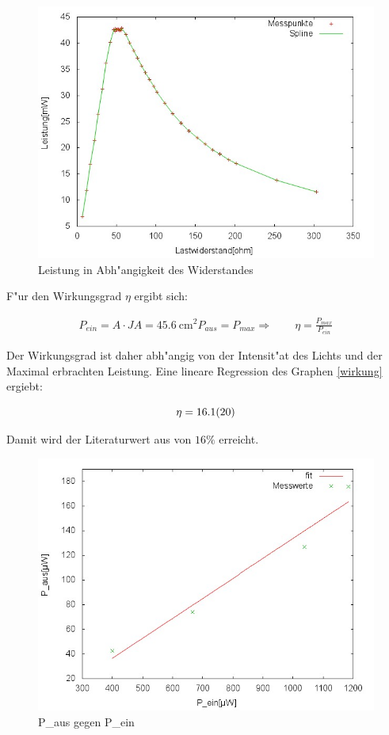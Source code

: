 \begin{figure}[htbp]
		\centering
		\includegraphics[width = 12cm]{img/718p.jpg}
		\caption{Leistung in Abh"angigkeit des Widerstandes}
		\label{PR4}
	\end{figure}

	F"ur den Wirkungsgrad $\eta$ ergibt sich:

	\begin{eqnarray*}
		P_{ein} = A \cdot J
		A = \SI{45.6}{\centi\meter^2}
		P_{aus} = P_{max}
		\Rightarrow \qquad \eta = \frac{P_{max}}{P_{ein}} 
	\end{eqnarray*}

	Der Wirkungsgrad ist daher abh"angig von der Intensit"at des Lichts und der Maximal erbrachten Leistung.
	Eine lineare Regression des Graphen \eqref{wirkung} ergiebt:

	\begin{equation*}
		\eta = \SI{16.1 (20)}{}
	\end{equation*}

	Damit wird der Literaturwert aus \cite{artikel2} von $16\%$ erreicht.

	

	\begin{figure}[htbp]
		\centering
		\includegraphics[width = 12cm]{img/wirkung.jpg}
		\caption{P_{aus} gegen P_{ein}}
		\label{wirkung}
	\end{figure}